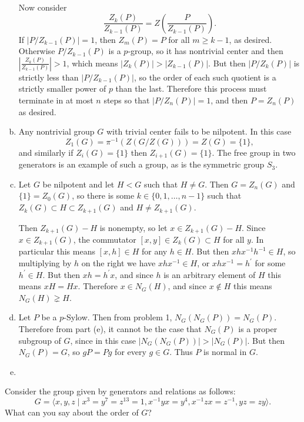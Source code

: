 \documentclass{article}
\newcounter{Problem}
\newenvironment{Problem}{\begin{Exercise}[name={Problem},
                                          counter={Problem}]}
                        {\end{Exercise}}
\begin{document}
\begin{Answer}
\begin{enumerate}[(a)]
{    Now consider
    $$
    \frac{Z_k(P)}{Z_{k-1}(P)} = Z\left(\frac{P}{Z_{k-1}(P)}\right).
    $$
    If $|P / Z_{k-1}(P)| = 1$, then $Z_{m}(P) = P$ for all $m \geq
    k-1$, as desired. Otherwise $P / Z_{k-1}(P)$ is a $p$-group,
    so it has nontrivial center and then
    $\left|\frac{Z_k(P)}{Z_{k-1}(P)}\right| > 1$, which means
    $|Z_k(P)| > |Z_{k-1}(P)|$. But then
    $|P / Z_k(P)|$ is strictly less than $|P / Z_{k-1}(P)|$, so the
    order of each such quotient is a strictly smaller power of
    $p$ than the last. Therefore this process must terminate in at
    most $n$ steps so that $|P / Z_n(P)| = 1$,
    and then $P = Z_n(P)$ as desired.
  }
  \item{
    Any nontrivial group $G$ with trivial center fails to be nilpotent.
    In this case
    $$
    Z_1(G) = \pi^{-1}(Z(G / Z(G))) = Z(G) = \{ 1 \},
    $$
    and similarly if
    $Z_i(G) = \{ 1 \}$ then $Z_{i+1}(G) = \{ 1 \}$. The free group in
    two generators is an example of such a group, as is the symmetric
    group $S_3$.
  }
  \item{
    Let $G$ be nilpotent and let $H < G$ such that $H \neq G$.
    Then $G = Z_n(G)$ and $\{ 1 \} = Z_0(G)$, so there is some
    $k \in \{0, 1, \dots, n-1\}$ such that
    $Z_k(G) \subset H \subset Z_{k+1}(G)$ and $H \neq Z_{k+1}(G)$.

    Then $Z_{k+1}(G) - H$ is nonempty, so let $x \in Z_{k+1}(G) - H$.
    Since $x \in Z_{k+1}(G)$, the commutator
    $[x, y] \in Z_{k}(G) \subset H$ for all $y$. In particular this means
    $[x, h] \in H$ for any $h \in H$. But then
    $x h x^{-1} h^{-1} \in H$, so multiplying by $h$ on the right we
    have $x h x^{-1} \in H$, or $x h x^{-1} = h^\prime$ for some
    $h^\prime \in H$. But then $x h = h^\prime x$, and since $h$ is an
    arbitrary element of $H$ this means $x H = H x$. Therefore
    $x \in N_G(H)$, and since $x \notin H$ this means
    $N_G(H) \gneq H$.
  }
  \item{
    Let $P$ be a $p$-Sylow. Then from problem 1, $N_G(N_G(P)) =
    N_G(P)$. Therefore from part (e), it cannot be the case that
    $N_G(P)$ is a proper subgroup of $G$, since in this case
    $|N_G(N_G(P))| > |N_G(P)|$. But then $N_G(P) = G$, so $gP = Pg$
    for every $g \in G$. Thus $P$ is normal in $G$.
  }
  \item{
  }
\end{enumerate}
\end{Answer}

\pagebreak

\begin{Problem}
Consider the group given by generators and relations as follows:
$$
G = \langle
      x, y, z
    \mid
      x^3 = y^7 = z^{13} = 1,
      x^{-1} y x = y^4,
      x^{-1} z x = z^{-1},
      yz = zy
    \rangle.
$$
What can you say about the order of $G$?
\end{Problem}
\end{document}
